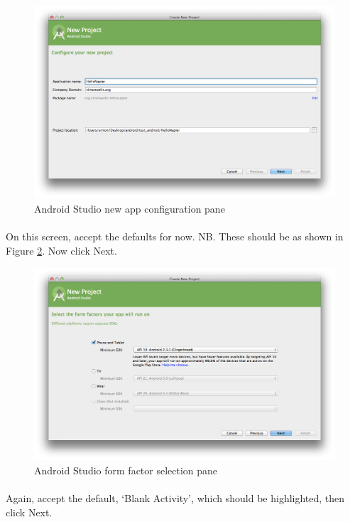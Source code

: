 \begin{figure}[H]
\centering
\includegraphics[width=\textwidth]{images/android-studio_02_configure}
\caption{Android Studio new app configuration pane}
\label{fig:android.studio_config}
\end{figure}

\paragraph{} On this screen, accept the defaults for now. NB. These should be as shown in Figure \ref{fig:android.studio_form}. Now click Next.

\begin{figure}[H]
\centering
\includegraphics[width=\textwidth]{images/android-studio_03_form-factors}
\caption{Android Studio form factor selection pane}
\label{fig:android.studio_form}
\end{figure}

\paragraph{} Again, accept the default, `Blank Activity', which should be highlighted, then click Next.

